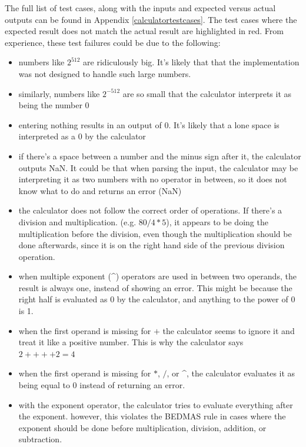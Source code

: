 \documentclass[letterpaper]{article}
\begin{document}
The full list of test cases, along with the inputs and expected versus actual outputs can be found in Appendix \ref{calculatortestcases}.
The test cases where the expected result does not match the actual result are highlighted in red.
From experience, these test failures could be due to the following:
\begin{itemize}
    \item numbers like $2^{512}$ are ridiculously big. It's likely that that the implementation was not designed to handle such large numbers.
    \item similarly, numbers like $2^{-512}$ are so small that the calculator interprets it as being the number 0
    \item entering nothing results in an output of 0. It's likely that a lone space is interpreted as a 0 by the calculator
    \item if there's a space between a number and the minus sign after it, the calculator outputs NaN. It could be that when parsing the input, the calculator may be interpreting it as two numbers with no operator in between, so it does not know what to do and returns an error (NaN)
    \item the calculator does not follow the correct order of operations.
          If there's a division and multiplication. (e.g. $80/4*5$),
          it appears to be doing the multiplication before the division,
          even though the multiplication should be done afterwards,
          since it is on the right hand side of the previous division operation.
    \item when multiple exponent (\textasciicircum) operators are used in between two operands,
          the result is always one, instead of showing an error. This might be because the right half is evaluated as 0 by the calculator,
          and anything to the power of 0 is 1.
    \item when the first operand is missing for $+$ the calculator seems to ignore it and treat it like a positive number. This is why the calculator says $2++++2=4$
    \item when the first operand is missing for $*$, $/$, or \textasciicircum, the calculator evaluates it as being equal to 0 instead of returning an error.
    \item with the exponent operator, the calculator tries to evaluate everything after the exponent.
          however, this violates the BEDMAS rule in cases where the exponent should be done before multiplication, division, addition, or subtraction.

\end{itemize}
\end{document}

